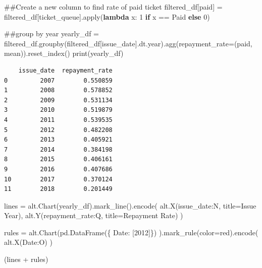 \documentclass[
]{article}
\newenvironment{Shaded}{\begin{snugshade}}{\end{snugshade}}
\newcommand{\BuiltInTok}[1]{\textcolor[rgb]{0.00,0.23,0.31}{#1}}
\newcommand{\CommentTok}[1]{\textcolor[rgb]{0.37,0.37,0.37}{#1}}
\newcommand{\ControlFlowTok}[1]{\textcolor[rgb]{0.00,0.23,0.31}{\textbf{#1}}}
\newcommand{\DecValTok}[1]{\textcolor[rgb]{0.68,0.00,0.00}{#1}}
\newcommand{\KeywordTok}[1]{\textcolor[rgb]{0.00,0.23,0.31}{\textbf{#1}}}
\newcommand{\NormalTok}[1]{\textcolor[rgb]{0.00,0.23,0.31}{#1}}
\newcommand{\OperatorTok}[1]{\textcolor[rgb]{0.37,0.37,0.37}{#1}}
\newcommand{\StringTok}[1]{\textcolor[rgb]{0.13,0.47,0.30}{#1}}
\begin{document}
\begin{Shaded}
\begin{Highlighting}[]
\CommentTok{\#\#Create a new column to find rate of paid ticket}
\NormalTok{filtered\_df[}\StringTok{\textquotesingle{}paid\textquotesingle{}}\NormalTok{] }\OperatorTok{=}\NormalTok{ filtered\_df[}\StringTok{\textquotesingle{}ticket\_queue\textquotesingle{}}\NormalTok{].}\BuiltInTok{apply}\NormalTok{(}\KeywordTok{lambda}\NormalTok{ x: }\DecValTok{1} \ControlFlowTok{if}\NormalTok{ x }\OperatorTok{==} \StringTok{\textquotesingle{}Paid\textquotesingle{}} \ControlFlowTok{else} \DecValTok{0}\NormalTok{)}

\CommentTok{\#\#group by year}
\NormalTok{yearly\_df }\OperatorTok{=}\NormalTok{ filtered\_df.groupby(filtered\_df[}\StringTok{\textquotesingle{}issue\_date\textquotesingle{}}\NormalTok{].dt.year).agg(repayment\_rate}\OperatorTok{=}\NormalTok{(}\StringTok{\textquotesingle{}paid\textquotesingle{}}\NormalTok{, }\StringTok{\textquotesingle{}mean\textquotesingle{}}\NormalTok{)).reset\_index()}
\BuiltInTok{print}\NormalTok{(yearly\_df)}
\end{Highlighting}
\end{Shaded}

\begin{verbatim}
    issue_date  repayment_rate
0         2007        0.550859
1         2008        0.578852
2         2009        0.531134
3         2010        0.519879
4         2011        0.539535
5         2012        0.482208
6         2013        0.405921
7         2014        0.384198
8         2015        0.406161
9         2016        0.407686
10        2017        0.370124
11        2018        0.201449
\end{verbatim}

\begin{Shaded}
\begin{Highlighting}[]
\NormalTok{lines }\OperatorTok{=}\NormalTok{ alt.Chart(yearly\_df).mark\_line().encode(}
\NormalTok{    alt.X(}\StringTok{\textquotesingle{}issue\_date:N\textquotesingle{}}\NormalTok{, title}\OperatorTok{=}\StringTok{\textquotesingle{}Issue Year\textquotesingle{}}\NormalTok{),}
\NormalTok{    alt.Y(}\StringTok{\textquotesingle{}repayment\_rate:Q\textquotesingle{}}\NormalTok{, title}\OperatorTok{=}\StringTok{\textquotesingle{}Repayment Rate\textquotesingle{}}\NormalTok{)}
\NormalTok{)}

\NormalTok{rules }\OperatorTok{=}\NormalTok{ alt.Chart(pd.DataFrame(\{}
    \StringTok{\textquotesingle{}Date\textquotesingle{}}\NormalTok{: [}\DecValTok{2012}\NormalTok{]\})}
\NormalTok{).mark\_rule(color}\OperatorTok{=}\StringTok{\textquotesingle{}red\textquotesingle{}}\NormalTok{).encode(}
\NormalTok{    alt.X(}\StringTok{\textquotesingle{}Date:O\textquotesingle{}}\NormalTok{)}
\NormalTok{)}

\NormalTok{(lines }\OperatorTok{+}\NormalTok{ rules)}
\end{Highlighting}
\end{Shaded}
\end{document}
